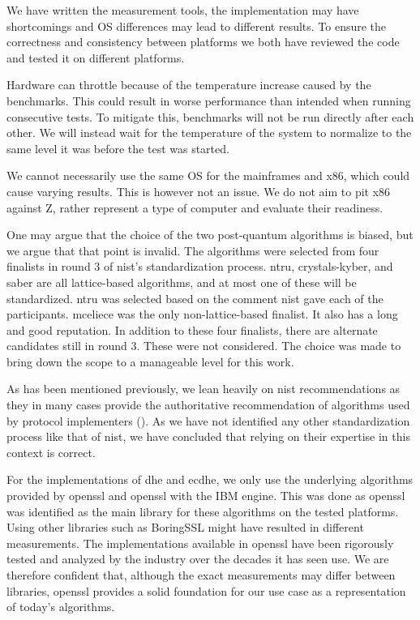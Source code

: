 We have written the measurement tools, the implementation may have shortcomings and OS differences may lead to different results. To ensure the correctness and consistency between platforms we both have reviewed the code and tested it on different platforms.

Hardware can throttle because of the temperature increase caused by the benchmarks. This could result in worse performance than intended when running consecutive tests. To mitigate this, benchmarks will not be run directly after each other. We will instead wait for the temperature of the system to normalize to the same level it was before the test was started.

We cannot necessarily use the same OS for the mainframes and x86, which could cause varying results. This is however not an issue. We do not aim to pit x86 against Z, rather represent a type of computer and evaluate their readiness.

One may argue that the choice of the two post-quantum algorithms is biased, but we argue that that point is invalid. The algorithms were selected from four finalists in round 3 of \gls{nist}'s standardization process. \gls{ntru}, \gls{crystals-kyber}, and \gls{saber} are all lattice-based algorithms, and at most one of these will be standardized. \gls{ntru} was selected based on the comment \gls{nist} gave each of the participants. \gls{mceliece} was the only non-lattice-based finalist. It also has a long and good reputation\cite{nist2020}. In addition to these four finalists, there are alternate candidates still in round 3. These were not considered. The choice was made to bring down the scope to a manageable level for this work.

As has been mentioned previously, we lean heavily on \gls{nist} recommendations as they in many cases provide the authoritative recommendation of algorithms used by protocol implementers (). As we have not identified any other standardization process like that of \gls{nist}, we have concluded that relying on their expertise in this context is correct.

For the implementations of \gls{dhe} and \gls{ecdhe}, we only use the underlying algorithms provided by \gls{openssl} and \gls{openssl} with the IBM engine. This was done as \gls{openssl} was identified as the main library for these algorithms on the tested platforms. Using other libraries such as BoringSSL might have resulted in different measurements. The implementations available in \gls{openssl} have been rigorously tested and analyzed by the industry over the decades it has seen use. We are therefore confident that, although the exact measurements may differ between libraries, \gls{openssl} provides a solid foundation for our use case as a representation of today's algorithms.

